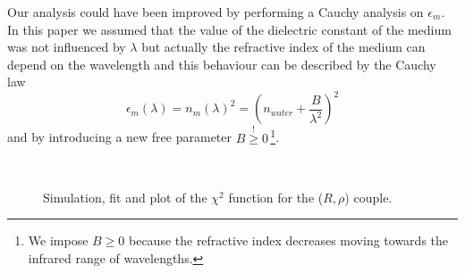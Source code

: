 \documentclass[twocolumn]{article}
\begin{document}
\begin{multicols}{2}
Our analysis could have been improved by performing a Cauchy analysis on $\epsilon_m$. In this paper we assumed that the value of the dielectric constant of the medium was not influenced by $\lambda$ but actually the refractive index of the medium can depend on the wavelength and this behaviour can be described by the Cauchy law
\begin{equation*}
\epsilon_{m}(\lambda)=n_{m}(\lambda)^{2}=\left(n_{water}+\frac{B}{\lambda^{2}}\right)^{2}
\end{equation*}
and by introducing a new free parameter $B\overset{!}{\geq} 0$\,\footnote{We impose $B\geq 0$ because the refractive index decreases moving towards the infrared range of wavelengths.}.


\end{multicols}
\begin{figure}[H]
\centering
{} 
 \\
\caption{Simulation, fit and plot of the $\chi^2$ function for the ($R,\rho$) couple.}
\label{fig:r_rho}
\end{figure}
\end{document}
